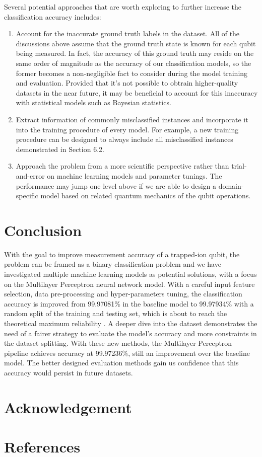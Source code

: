 \documentclass[letterpaper,twocolumn,10pt]{article}
\begin{document}
Several potential approaches that are worth exploring to further increase the classification accuracy includes:

\begin{enumerate}
    \item 
    Account for the inaccurate ground truth labels in the dataset. All of the discussions above assume that the ground truth state is known for each qubit being measured. In fact, the accuracy of this ground truth may reside on the same order of magnitude as the accuracy of our classification models, so the former becomes a non-negligible fact to consider during the model training and evaluation. Provided that it's not possible to obtrain higher-quality datasets in the near future, it may be beneficial to account for this inaccuracy with statistical models such as Bayesian statistics. 

    \item 
    Extract information of commonly misclassified instances and incorporate it into the training procedure of every model. For example, a new training procedure can be designed to always include all misclassified instances demonstrated in Section 6.2.

    \item 
    Approach the problem from a more scientific perspective rather than trial-and-error on machine learning models and parameter tunings. The performance may jump one level above if we are able to design a domain-specific model based on related quantum mechanics of the qubit operations.

\end{enumerate}

\section{Conclusion}

With the goal to improve measurement accuracy of a trapped-ion qubit, the problem can be framed as a binary classification problem and we have investigated multiple machine learning models as potential solutions, with a focus on the Multilayer Perceptron neural network model. With a careful input feature selection, data pre-processing and hyper-parameters tuning, the classification accuracy is improved from 99.97081\% in the baseline model to 99.97934\% with a random split of the training and testing set, which is about to reach the theoretical maximum reliability . A deeper dive into the dataset demonstrates the need of a fairer strategy to evaluate the model's accuracy and more constraints in the dataset splitting. With these new methods, the Multilayer Perceptron pipeline achieves accuracy at 99.97236\%, still an improvement over the baseline model. The better designed evaluation methods gain us confidence that this accuracy would persist in future datasets.


\section{Acknowledgement}

\section{References}
\end{document}
